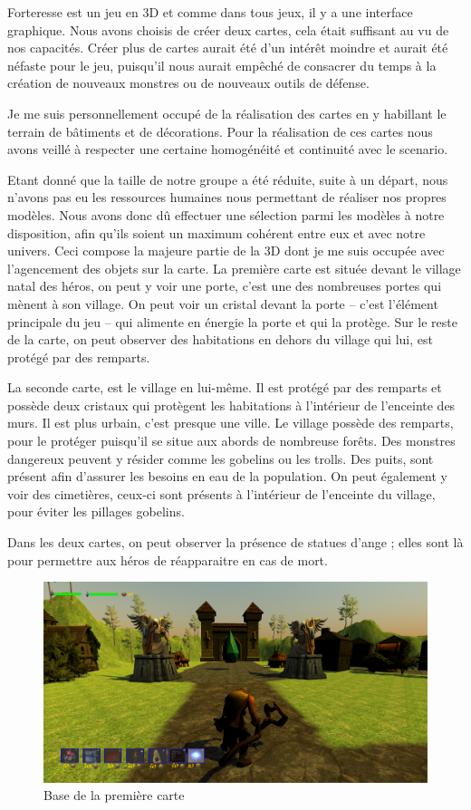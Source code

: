 \documentclass[a4paper, 12pt]{article}
\begin{document}
		Forteresse est un jeu en 3D et comme dans tous jeux, il y a une interface graphique. Nous avons choisis de créer deux cartes, cela était suffisant au vu de nos capacités. Créer plus de cartes aurait été d’un intérêt moindre et aurait été néfaste pour le jeu, puisqu’il nous aurait empêché de consacrer du temps à la création de nouveaux monstres ou de nouveaux outils de défense. 
\par Je me suis personnellement occupé de la réalisation des cartes en y habillant le terrain de bâtiments et de décorations. Pour la réalisation de ces cartes nous avons veillé à respecter une certaine homogénéité  et continuité avec le scenario. 
\par Etant donné que la taille de notre groupe a été réduite, suite à un départ, nous n’avons pas eu les ressources humaines nous permettant de réaliser nos propres modèles. Nous avons donc dû effectuer une sélection parmi les modèles à notre disposition, afin qu’ils soient un maximum cohérent entre eux et avec notre univers. Ceci compose la majeure partie de la 3D dont je me suis occupée avec l'agencement des objets sur la carte.
La première carte est située devant le village natal des héros, on peut y voir une porte, c’est une des nombreuses portes qui mènent à son village. On peut voir un cristal devant la porte – c’est l’élément principale du jeu – qui alimente en énergie la porte et qui la protège. Sur le reste de la carte, on peut observer des habitations en dehors du village qui lui, est protégé par des remparts.
\par La seconde carte, est le village en lui-même. Il est protégé par des remparts et possède deux cristaux qui protègent les habitations à l’intérieur de l’enceinte des murs. Il est plus urbain, c’est presque une ville. Le village possède des remparts, pour le protéger puisqu’il se situe aux abords de nombreuse forêts. Des monstres dangereux peuvent y résider comme les gobelins ou les trolls. Des puits, sont présent afin d’assurer les besoins en eau de la population. On peut également y voir des cimetières, ceux-ci sont présents à l’intérieur de l’enceinte du village, pour éviter les pillages gobelins. 
\par Dans les deux cartes, on peut observer la présence de statues d’ange ; elles sont là pour permettre aux héros de réapparaitre en cas de mort.

\begin{figure}[!ht]
\centerline{\includegraphics[scale=0.3]{3D.png}}
\caption*{Base de la premi\`ere carte}
\end{figure}
\end{document}
